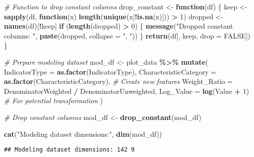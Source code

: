 \documentclass[
]{article}
\newenvironment{Shaded}{\begin{snugshade}}{\end{snugshade}}
\newcommand{\AttributeTok}[1]{\textcolor[rgb]{0.13,0.29,0.53}{#1}}
\newcommand{\CommentTok}[1]{\textcolor[rgb]{0.56,0.35,0.01}{\textit{#1}}}
\newcommand{\ConstantTok}[1]{\textcolor[rgb]{0.56,0.35,0.01}{#1}}
\newcommand{\ControlFlowTok}[1]{\textcolor[rgb]{0.13,0.29,0.53}{\textbf{#1}}}
\newcommand{\DecValTok}[1]{\textcolor[rgb]{0.00,0.00,0.81}{#1}}
\newcommand{\FunctionTok}[1]{\textcolor[rgb]{0.13,0.29,0.53}{\textbf{#1}}}
\newcommand{\NormalTok}[1]{#1}
\newcommand{\OtherTok}[1]{\textcolor[rgb]{0.56,0.35,0.01}{#1}}
\newcommand{\SpecialCharTok}[1]{\textcolor[rgb]{0.81,0.36,0.00}{\textbf{#1}}}
\newcommand{\StringTok}[1]{\textcolor[rgb]{0.31,0.60,0.02}{#1}}
\begin{document}
\begin{Shaded}
\begin{Highlighting}[]
\CommentTok{\# Function to drop constant columns}
\NormalTok{drop\_constant }\OtherTok{\textless{}{-}} \ControlFlowTok{function}\NormalTok{(df) \{}
\NormalTok{  keep }\OtherTok{\textless{}{-}} \FunctionTok{sapply}\NormalTok{(df, }\ControlFlowTok{function}\NormalTok{(x) }\FunctionTok{length}\NormalTok{(}\FunctionTok{unique}\NormalTok{(x[}\SpecialCharTok{!}\FunctionTok{is.na}\NormalTok{(x)])) }\SpecialCharTok{\textgreater{}} \DecValTok{1}\NormalTok{)}
\NormalTok{  dropped }\OtherTok{\textless{}{-}} \FunctionTok{names}\NormalTok{(df)[}\SpecialCharTok{!}\NormalTok{keep]}
  \ControlFlowTok{if}\NormalTok{ (}\FunctionTok{length}\NormalTok{(dropped) }\SpecialCharTok{\textgreater{}} \DecValTok{0}\NormalTok{) \{}
    \FunctionTok{message}\NormalTok{(}\StringTok{"Dropped constant columns: "}\NormalTok{, }\FunctionTok{paste}\NormalTok{(dropped, }\AttributeTok{collapse =} \StringTok{", "}\NormalTok{))}
\NormalTok{  \}}
  \FunctionTok{return}\NormalTok{(df[, keep, }\AttributeTok{drop =} \ConstantTok{FALSE}\NormalTok{])}
\NormalTok{\}}

\CommentTok{\# Prepare modeling dataset}
\NormalTok{mod\_df }\OtherTok{\textless{}{-}}\NormalTok{ plot\_data }\SpecialCharTok{\%\textgreater{}\%}
  \FunctionTok{mutate}\NormalTok{(}
    \AttributeTok{IndicatorType =} \FunctionTok{as.factor}\NormalTok{(IndicatorType),}
    \AttributeTok{CharacteristicCategory =} \FunctionTok{as.factor}\NormalTok{(CharacteristicCategory),}
    \CommentTok{\# Create new features}
    \AttributeTok{Weight\_Ratio =}\NormalTok{ DenominatorWeighted }\SpecialCharTok{/}\NormalTok{ DenominatorUnweighted,}
    \AttributeTok{Log\_Value =} \FunctionTok{log}\NormalTok{(Value }\SpecialCharTok{+} \DecValTok{1}\NormalTok{)  }\CommentTok{\# For potential transformation}
\NormalTok{  )}

\CommentTok{\# Drop constant columns}
\NormalTok{mod\_df }\OtherTok{\textless{}{-}} \FunctionTok{drop\_constant}\NormalTok{(mod\_df)}

\FunctionTok{cat}\NormalTok{(}\StringTok{"Modeling dataset dimensions:"}\NormalTok{, }\FunctionTok{dim}\NormalTok{(mod\_df))}
\end{Highlighting}
\end{Shaded}

\begin{verbatim}
## Modeling dataset dimensions: 142 9
\end{verbatim}
\end{document}
